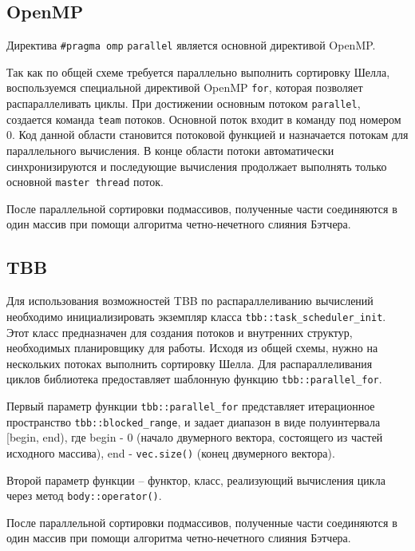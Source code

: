 \documentclass{report}
\begin{document}
\subsection*{OpenMP}
\par Директива \verb|#pragma omp| \verb|parallel| является основной директивой OpenMP. 
\par Так как по общей схеме требуется параллельно выполнить сортировку Шелла, воспользуемся специальной директивой OpenMP \verb|for|, которая позволяет распараллеливать циклы. При достижении основным потоком \verb|parallel|, создается команда \verb|team| потоков. Основной поток входит в команду под номером 0. Код данной области становится потоковой функцией и назначается потокам для параллельного вычисления. В конце области потоки автоматически синхронизируются и последующие вычисления продолжает выполнять только основной \verb|master thread| поток.
\par После параллельной сортировки подмассивов, полученные части соединяются в один массив при помощи алгоритма четно-нечетного слияния Бэтчера.

\subsection*{TBB}
Для использования возможностей TBB по распараллеливанию вычислений необходимо инициализировать экземпляр класса \verb|tbb::task_scheduler_init|. Этот класс предназначен для создания потоков и внутренних структур, необходимых планировщику для работы. Исходя из общей схемы, нужно на нескольких потоках выполнить сортировку Шелла. Для распараллеливания циклов библиотека предоставляет шаблонную функцию \verb|tbb::parallel_for|.
\par Первый параметр функции  \verb|tbb::parallel_for| представляет итерационное пространство \verb|tbb::blocked_range|, и задает диапазон в виде полуинтервала [begin, end), где begin - 0 (начало двумерного вектора, состоящего из частей исходного массива), end - \verb|vec.size()| (конец двумерного вектора).
\par Второй параметр функции – функтор, класс, реализующий вычисления цикла через метод \verb|body::operator()|.
\par После параллельной сортировки подмассивов, полученные части соединяются в один массив при помощи алгоритма четно-нечетного слияния Бэтчера.
\end{document}
